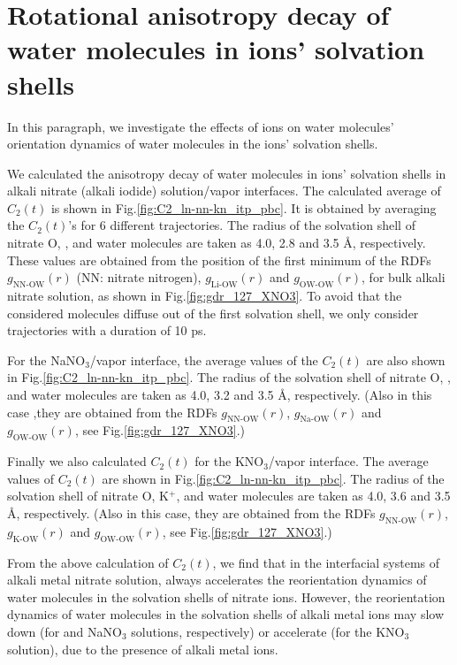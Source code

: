 \FloatBarrier
\section{Rotational anisotropy decay of water molecules in ions' solvation shells}\label{RAD_SHELL}
In this paragraph, we investigate the effects of ions on  water molecules' orientation dynamics of water molecules in the ions' solvation shells. 

We calculated the anisotropy decay of water molecules in ions' solvation shells in alkali nitrate (alkali iodide) solution/vapor interfaces. 
The calculated average of $C_2(t)$ is shown in Fig.\thinspace\ref{fig:C2_ln-nn-kn_itp_pbc}. 
It is obtained by averaging the $C_2(t)$'s for 6 different trajectories.
The radius of the solvation shell of nitrate O, \Li, and water molecules are taken as 4.0, 2.8 and 3.5 \AA, respectively. 
These values are obtained from the position of the first minimum of the RDFs $g_{\text{NN-OW}}(r)$ (NN: nitrate nitrogen), $g_{\text{Li-OW}}(r)$ and $g_{\text{OW-OW}}(r)$,
for bulk alkali nitrate solution, as shown in Fig.\thinspace\ref{fig:gdr_127_XNO3}. 
To avoid that the considered molecules diffuse out of the first solvation shell, we only consider trajectories with a duration of 10 ps. 

For the NaNO$_3$/vapor interface, the average values of the $C_2(t)$ are also shown in 
Fig.\thinspace\ref{fig:C2_ln-nn-kn_itp_pbc}. 
The radius of the solvation shell of nitrate O, \Na, and water molecules are taken as 4.0, 3.2 and 3.5 \AA, respectively. 
(Also in this case ,they are obtained from the RDFs $g_{\text{NN-OW}}(r)$, $g_{\text{Na-OW}}(r)$ and $g_{\text{OW-OW}}(r)$,
see Fig.\thinspace\ref{fig:gdr_127_XNO3}.) 

Finally we also calculated $C_2(t)$ for the KNO$_3$/vapor interface. 
The average values of $C_2(t)$ are shown in Fig.\thinspace\ref{fig:C2_ln-nn-kn_itp_pbc}.
The radius of the solvation shell of nitrate O, K$^+$, and water molecules are taken as 4.0, 3.6 and 3.5 \AA, respectively. 
(Also in this case, they are obtained from the RDFs $g_{\text{NN-OW}}(r)$, $g_{\text{K-OW}}(r)$ and $g_{\text{OW-OW}}(r)$,
see Fig.\thinspace\ref{fig:gdr_127_XNO3}.) 

From the above calculation of $C_2(t)$, we find that in the interfacial systems of alkali metal nitrate solution, 
\nitrate always accelerates the reorientation dynamics of water molecules in the solvation shells of nitrate ions.
However, the reorientation dynamics of water molecules in the solvation shells of alkali metal ions may slow down 
(for \LiN and NaNO$_3$ solutions, respectively) or accelerate (for the KNO$_3$ solution), 
due to the presence of alkali metal ions. 


